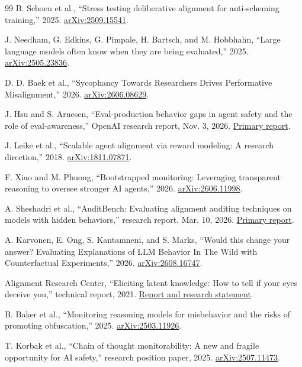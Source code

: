 \documentclass[10pt,twocolumn,letterpaper]{article}
\begin{document}
\begin{thebibliography}{99}
 B. Schoen et al., ``Stress testing deliberative alignment for anti-scheming training,'' 2025. \href{https://arxiv.org/abs/2509.15541}{arXiv:2509.15541}.

 J. Needham, G. Edkins, G. Pimpale, H. Bartsch, and M. Hobbhahn, ``Large language models often know when they are being evaluated,'' 2025. \href{https://arxiv.org/abs/2505.23836}{arXiv:2505.23836}.

 D. D. Baek et al., ``Sycophancy Towards Researchers Drives Performative Misalignment,'' 2026. \href{https://arxiv.org/abs/2606.08629}{arXiv:2606.08629}.

 J. Hsu and S. Arnesen, ``Eval-production behavior gaps in agent safety and the role of eval-awareness,'' OpenAI research report, Nov. 3, 2026. \href{https://alignment.openai.com/eval-production-behavior-gap/}{Primary report}.

 J. Leike et al., ``Scalable agent alignment via reward modeling: A research direction,'' 2018. \href{https://arxiv.org/abs/1811.07871}{arXiv:1811.07871}.

 F. Xiao and M. Phuong, ``Bootstrapped monitoring: Leveraging transparent reasoning to oversee stronger AI agents,'' 2026. \href{https://arxiv.org/abs/2606.11998}{arXiv:2606.11998}.

 A. Sheshadri et al., ``AuditBench: Evaluating alignment auditing techniques on models with hidden behaviors,'' research report, Mar. 10, 2026. \href{https://alignment.anthropic.com/2026/auditbench/}{Primary report}.

 A. Karvonen, E. Ong, S. Kantamneni, and S. Marks, ``Would this change your answer? Evaluating Explanations of LLM Behavior In The Wild with Counterfactual Experiments,'' 2026. \href{https://arxiv.org/abs/2608.16747}{arXiv:2608.16747}.

 Alignment Research Center, ``Eliciting latent knowledge: How to tell if your eyes deceive you,'' technical report, 2021. \href{https://www.alignment.org/blog/arcs-first-technical-report-eliciting-latent-knowledge/}{Report and research statement}.

 B. Baker et al., ``Monitoring reasoning models for misbehavior and the risks of promoting obfuscation,'' 2025. \href{https://arxiv.org/abs/2503.11926}{arXiv:2503.11926}.

 T. Korbak et al., ``Chain of thought monitorability: A new and fragile opportunity for AI safety,'' research position paper, 2025. \href{https://arxiv.org/abs/2507.11473}{arXiv:2507.11473}.


\end{thebibliography}
\end{document}
